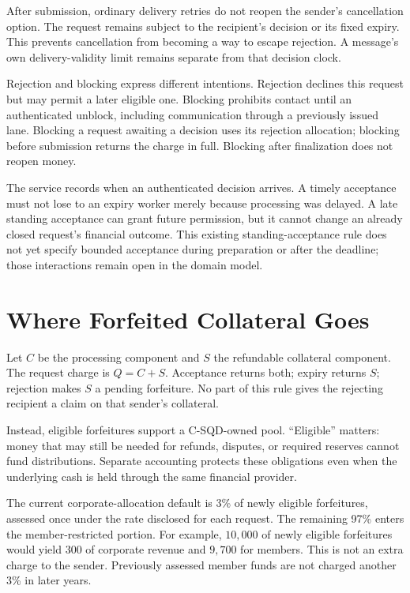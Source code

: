 \documentclass[11pt]{article}
\begin{document}
After submission, ordinary delivery retries do not reopen the sender's cancellation
option. The request remains subject to the recipient's decision or its fixed
expiry. This prevents cancellation from becoming a way to escape rejection.
A message's own delivery-validity limit remains separate from that decision clock.

Rejection and blocking express different intentions. Rejection declines this
request but may permit a later eligible one. Blocking prohibits contact until an
authenticated unblock, including communication through a previously issued lane.
Blocking a request awaiting a decision uses its rejection allocation; blocking before submission
returns the charge in full. Blocking after finalization does not reopen money.

The service records when an authenticated decision arrives. A timely acceptance
must not lose to an expiry worker merely because processing was delayed. A late
standing acceptance can grant future permission, but it cannot change an already closed
request's financial outcome. This existing standing-acceptance rule does not
yet specify bounded acceptance during preparation or after the deadline; those
interactions remain open in the domain model.

\section{Where Forfeited Collateral Goes}

Let $C$ be the processing component and $S$ the refundable collateral component.
The request charge is $Q=C+S$. Acceptance returns both; expiry returns $S$;
rejection makes $S$ a pending forfeiture. No part of this rule gives the rejecting
recipient a claim on that sender's collateral.

Instead, eligible forfeitures support a C-SQD-owned pool. ``Eligible'' matters:
money that may still be needed for refunds, disputes, or required reserves cannot
fund distributions. Separate accounting protects these obligations even when
the underlying cash is held through the same financial provider.

The current corporate-allocation default is 3\% of newly eligible forfeitures, assessed
once under the rate disclosed for each request. The remaining 97\% enters the
member-restricted portion. For example, $10{,}000$ of newly eligible forfeitures
would yield $300$ of corporate revenue and $9{,}700$ for members. This is not an
extra charge to the sender. Previously assessed member funds are not charged
another 3\% in later years.
\end{document}
